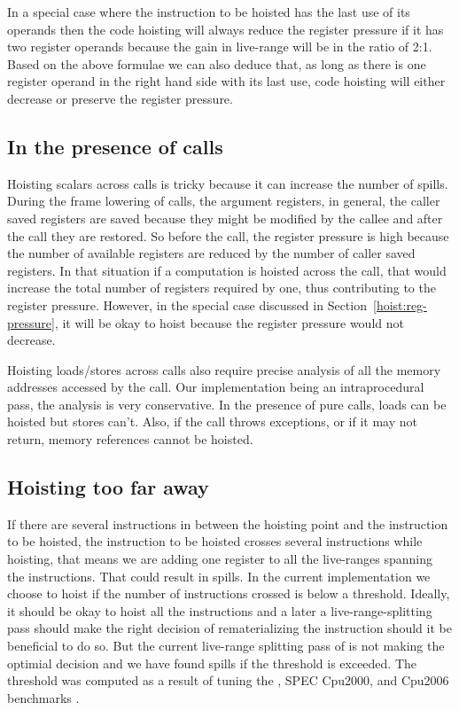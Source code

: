 \documentclass{sig-alternate}
\begin{document}
In a special case where the instruction to be hoisted has the last use of its
operands then the code hoisting will always reduce the register pressure if it
has two register operands because the gain in live-range will be in the ratio of
2:1. Based on the above formulae we can also deduce that, as long as there is
one register operand in the right hand side with its last use, code hoisting
will either decrease or preserve the register pressure.

\subsection{In the presence of calls}
\label{cost:across-calls}
Hoisting scalars across calls is tricky because it can increase the number of
spills. During the frame lowering of calls, the argument registers, in general,
the caller saved registers are saved because they might be modified by the
callee and after the call they are restored. So before the
call, the register pressure is high because the number of available registers
are reduced by the number of caller saved registers. In that situation if a
computation is hoisted across the call, that would increase the total number of
registers required by one, thus contributing to the register pressure. However,
in the special case discussed in Section~\ref{hoist:reg-pressure}, it will be
okay to hoist because the register pressure would not decrease.

Hoisting loads/stores across calls also require precise analysis of all the
memory addresses accessed by the call. Our implementation being an
intraprocedural pass, the analysis is very conservative. In the presence of pure
calls, loads can be hoisted but stores can't. Also, if the call throws
exceptions, or if it may not return, memory references cannot be hoisted.

\subsection{Hoisting too far away}
If there are several instructions in between the hoisting point and the
instruction to be hoisted, the instruction to be hoisted crosses several
instructions while hoisting, that means we are adding one register to all the
live-ranges spanning the instructions. That could result in spills. In the
current implementation we choose to hoist if the number of instructions crossed
is below a threshold. Ideally, it should be okay to hoist all the instructions
and a later a live-range-splitting \cite{cooper1998live} pass should make the
right decision of rematerializing the instruction should it be beneficial to do
so. But the current live-range splitting pass of \LLVM{} is not making the
optimial decision and we have found spills if the threshold is exceeded. The
threshold was computed as a result of tuning the \LLVMTestSuite{}, SPEC Cpu2000,
and Cpu2006 benchmarks \cite{Henning2000}.
\end{document}
